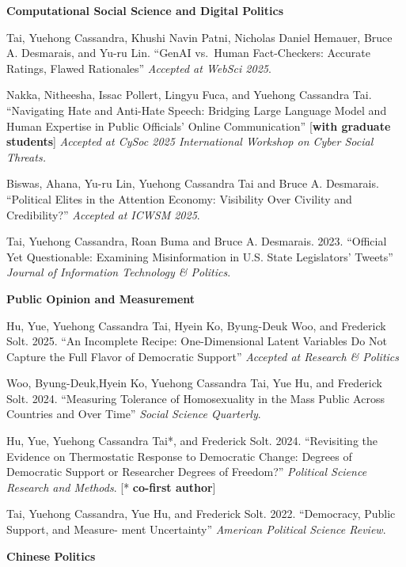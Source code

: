 \documentclass[10.5pt,]{article}
\providecommand{\tightlist}{%
	\setlength{\itemsep}{0pt}\setlength{\parskip}{0pt}}
\renewenvironment{itemize}{
	\begin{list}{}{
			\setlength{\leftmargin}{1.5em}
		}
	}{
	\end{list}
}
\begin{document}
\begin{itemize}
\tightlist
\item
  \textbf{Computational Social Science and Digital Politics}

  \begin{itemize}
  \item
    Tai, Yuehong Cassandra, Khushi Navin Patni, Nicholas Daniel Hemauer,
    Bruce A. Desmarais, and Yu-ru Lin. ``GenAI vs.~Human Fact-Checkers:
    Accurate Ratings, Flawed Rationales'' \emph{Accepted at WebSci
    2025}.
  \item
    Nakka, Nitheesha, Issac Pollert, Lingyu Fuca, and Yuehong Cassandra
    Tai. ``Navigating Hate and Anti-Hate Speech: Bridging Large Language
    Model and Human Expertise in Public Oﬀicials' Online Communication''
    {[}\textbf{with graduate students}{]} \emph{Accepted at CySoc 2025
    International Workshop on Cyber Social Threats.}
  \item
    Biswas, Ahana, Yu-ru Lin, Yuehong Cassandra Tai and Bruce A.
    Desmarais. ``Political Elites in the Attention Economy: Visibility
    Over Civility and Credibility?'' \emph{Accepted at ICWSM 2025}.
  \item
    Tai, Yuehong Cassandra, Roan Buma and Bruce A. Desmarais. 2023.
    ``Oﬀicial Yet Questionable: Examining Misinformation in U.S. State
    Legislators' Tweets'' \emph{Journal of Information Technology \&
    Politics}.
  \end{itemize}
\item
  \textbf{Public Opinion and Measurement}

  \begin{itemize}
  \tightlist
  \item
    Hu, Yue, Yuehong Cassandra Tai, Hyein Ko, Byung-Deuk Woo, and
    Frederick Solt. 2025. ``An Incomplete Recipe: One-Dimensional Latent
    Variables Do Not Capture the Full Flavor of Democratic Support''
    \emph{Accepted at Research \& Politics}
  \item
    Woo, Byung-Deuk,Hyein Ko, Yuehong Cassandra Tai, Yue Hu, and
    Frederick Solt. 2024. ``Measuring Tolerance of Homosexuality in the
    Mass Public Across Countries and Over Time'' \emph{Social Science
    Quarterly}.
  \item
    Hu, Yue, Yuehong Cassandra Tai*, and Frederick Solt. 2024.
    ``Revisiting the Evidence on Thermostatic Response to Democratic
    Change: Degrees of Democratic Support or Researcher Degrees of
    Freedom?'' \emph{Political Science Research and Methods}. {[}*
    \textbf{co-first author}{]}
  \item
    Tai, Yuehong Cassandra, Yue Hu, and Frederick Solt. 2022.
    ``Democracy, Public Support, and Measure- ment Uncertainty''
    \emph{American Political Science Review}.
  \end{itemize}
\item
  \textbf{Chinese Politics}


\end{itemize}
\end{document}
